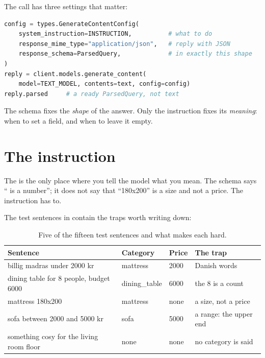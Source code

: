 \documentclass[11pt]{article}
\begin{document}
The call has three settings that matter:
\begin{lstlisting}[language=Python]
config = types.GenerateContentConfig(
    system_instruction=INSTRUCTION,          # what to do
    response_mime_type="application/json",   # reply with JSON
    response_schema=ParsedQuery,             # in exactly this shape
)
reply = client.models.generate_content(
    model=TEXT_MODEL, contents=text, config=config)
reply.parsed     # a ready ParsedQuery, not text
\end{lstlisting}

\begin{keypoint}
The schema fixes the \emph{shape} of the answer. Only the instruction
fixes its \emph{meaning}: when to set a field, and when to leave it
empty.
\end{keypoint}

\section{The instruction}

The  is the
only place where you tell the model what you mean. The schema says
`` is a number''; it does not say that ``180x200'' is a
size and not a price. The instruction has to.

The test sentences in  contain the
traps worth writing down:

\begin{table}[H]
\small
\begin{tabularx}{\textwidth}{@{}l l l X@{}}
\toprule
Sentence & Category & Price & The trap \\
\midrule
billig madras under 2000 kr & mattress & 2000 & Danish words \\
dining table for 8 people, budget 6000 & dining\_table & 6000 &
  the 8 is a count \\
mattress 180x200 & mattress & none & a size, not a price \\
sofa between 2000 and 5000 kr & sofa & 5000 & a range: the upper end \\
something cosy for the living room floor & none & none &
  \textcolor{accent}{no category is said} \\
\bottomrule
\end{tabularx}
\caption{Five of the fifteen test sentences and what makes each hard.}
\end{table}
\end{document}
